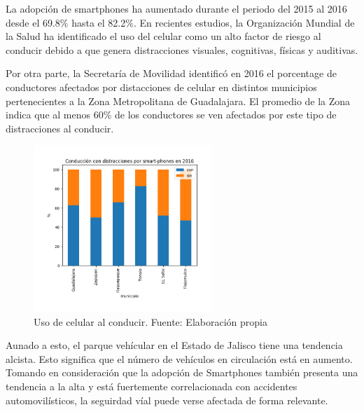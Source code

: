 \documentclass{article}
\begin{document}
La adopción de smartphones ha aumentado durante el periodo del 2015 al 2016 desde
el 69.8\% hasta el 82.2\%. En recientes estudios, la Organización Mundial de la Salud ha identificado
el uso del celular como un alto factor de riesgo al conducir debido a que genera distracciones
visuales, cognitivas, físicas y auditivas.

Por otra parte, la Secretaría de Movilidad identificó en 2016 el porcentage de conductores afectados
por distacciones de celular en distintos municipios pertenecientes a la Zona Metropolitana de Guadalajara.
El promedio de la Zona indica que al menos 60\% de los conductores se ven afectados por este tipo
de distracciones al conducir.

	\begin{figure}[H]\centering
	\includegraphics[width=0.6\textwidth]{resources/img/manejo_con_celular.png}
	\caption{\label{fig:manejo_celular} Uso de celular al conducir. Fuente: Elaboración propia}
    \end{figure}

Aunado a esto, el parque vehícular en el Estado de Jalisco tiene una tendencia alcista. Esto significa que el número
de vehículos en circulación está en aumento. Tomando en consideración que la adopción de Smartphones
también presenta una tendencia a la alta y está fuertemente correlacionada con accidentes automovilísticos,
la seguirdad víal puede verse afectada de forma relevante.
\end{document}
